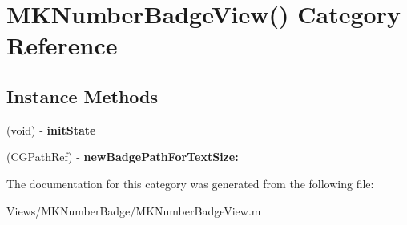 \hypertarget{category_m_k_number_badge_view_07_08}{\section{M\+K\+Number\+Badge\+View() Category Reference}
\label{category_m_k_number_badge_view_07_08}
}
\subsection*{Instance Methods}
\begin{DoxyCompactItemize}
\item 
\hypertarget{category_m_k_number_badge_view_07_08_ad9f544f765060e2a097d467dfd94cbde}{(void) -\/ {\bfseries init\+State}}\label{category_m_k_number_badge_view_07_08_ad9f544f765060e2a097d467dfd94cbde}

\item 
\hypertarget{category_m_k_number_badge_view_07_08_accaa33773f40db9748edda849ddf9f51}{(C\+G\+Path\+Ref) -\/ {\bfseries new\+Badge\+Path\+For\+Text\+Size\+:}}\label{category_m_k_number_badge_view_07_08_accaa33773f40db9748edda849ddf9f51}

\end{DoxyCompactItemize}


The documentation for this category was generated from the following file\+:\begin{DoxyCompactItemize}
\item 
Views/\+M\+K\+Number\+Badge/M\+K\+Number\+Badge\+View.\+m\end{DoxyCompactItemize}
